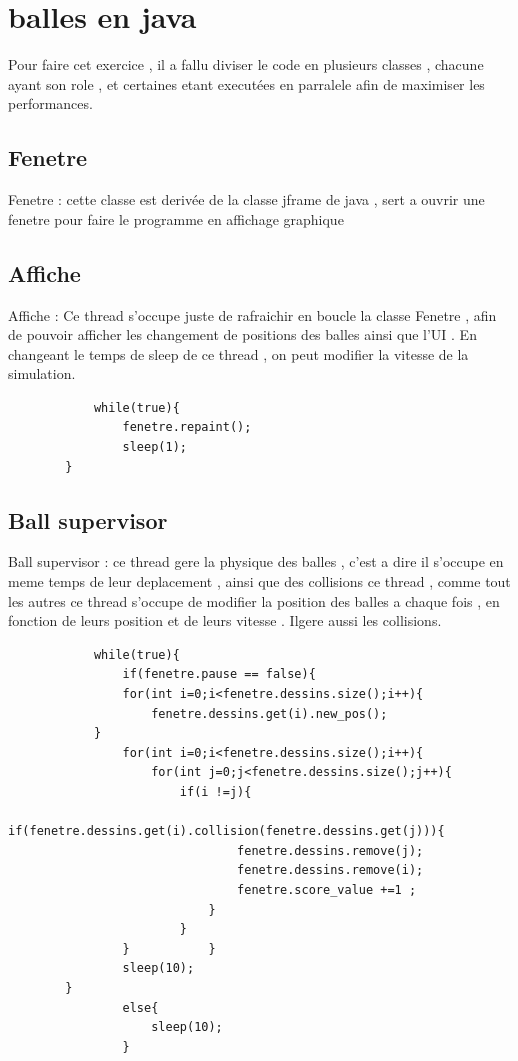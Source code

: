 \documentclass{report}
\begin{document}
\section{balles en java}
Pour faire cet exercice , il a fallu diviser le code en plusieurs classes , chacune ayant son role , et certaines etant executées en parralele afin de maximiser les performances.

\subsection{Fenetre}
 Fenetre : cette classe est derivée de la classe jframe de java , sert a ouvrir une fenetre pour faire le programme en affichage graphique

\subsection{Affiche}
 Affiche : Ce thread s'occupe juste de rafraichir en boucle la classe Fenetre , afin de pouvoir afficher les changement de positions des 
balles ainsi que l'UI . En changeant le temps de sleep de ce thread , on peut modifier la vitesse de la simulation.
\begin{verbatim}
			while(true){
				fenetre.repaint();
				sleep(1);
		}
\end{verbatim}

\subsection{Ball supervisor}

Ball supervisor : ce thread gere la physique des balles , c'est a dire il s'occupe en meme temps de leur deplacement , ainsi que des collisions
ce thread , comme tout les autres 
ce thread s'occupe de modifier la position des balles a chaque fois , en fonction
de leurs position et de leurs vitesse . Ilgere aussi les collisions.

\begin{verbatim}
			while(true){
				if(fenetre.pause == false){
				for(int i=0;i<fenetre.dessins.size();i++){
					fenetre.dessins.get(i).new_pos();
			}
				for(int i=0;i<fenetre.dessins.size();i++){
					for(int j=0;j<fenetre.dessins.size();j++){
						if(i !=j){
							if(fenetre.dessins.get(i).collision(fenetre.dessins.get(j))){
								fenetre.dessins.remove(j);
								fenetre.dessins.remove(i);
								fenetre.score_value +=1 ;
							}
						}
				}			}
				sleep(10);
		}
				else{
					sleep(10);
				}
\end{verbatim}
\end{document}
